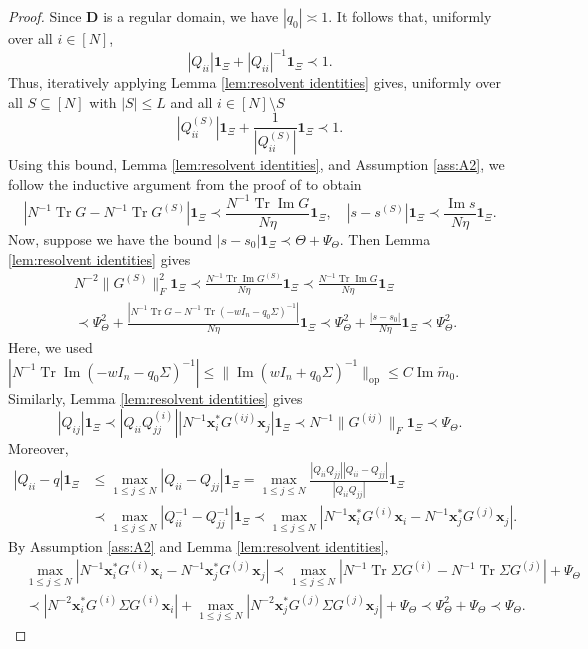 \documentclass[11pt,reqno]{amsart}
\def\x{\mathbf{x}}
\def\1{\mathbf{1}}
\def\bD{\mathbf{D}}
\def\Im{\operatorname{Im}}
\def\op{\mathrm{op}}
\def\Tr{\operatorname{Tr}}
\theoremstyle{definition}
\numberwithin{equation}{section}
\numberwithin{figure}{section}
\begin{document}
\begin{proof}
Since $\bD$ is a regular domain, we have $|q_0|\asymp 1$. It follows that, uniformly over all $i\in[N]$,
\[
    |Q_{ii}|\1_\Xi+|Q_{ii}|^{-1}\1_\Xi\prec 1.
\]
Thus, iteratively applying Lemma \ref{lem:resolvent identities} gives, uniformly over all $S\subseteq[N]$ with $|S|\leq L$ and all $i\in[N]\setminus S$
\[
    |Q_{ii}^{(S)}|\1_\Xi+\frac{1}{|Q_{ii}^{(S)}|}\1_\Xi\prec 1.
\]
Using this bound, Lemma \ref{lem:resolvent identities}, and Assumption \ref{ass:A2}, we follow the inductive argument from the proof of \cite[Lemma 4.2]{fan2026anisotropic} to obtain
\[
    |N^{-1}\Tr G-N^{-1}\Tr G^{(S)}|\1_\Xi\prec \frac{N^{-1}\Tr\Im G}{N\eta}\1_\Xi,\quad |s-s^{(S)}|\1_\Xi\prec \frac{\Im s}{N\eta}\1_\Xi.
\]
Now, suppose we have the bound $|s-s_0|\1_\Xi\prec\Theta+\Psi_\Theta$. Then Lemma \ref{lem:resolvent identities} gives
\begin{align*}
    &N^{-2}\|G^{(S)}\|_F^2\1_\Xi\prec\frac{N^{-1}\Tr\Im G^{(S)}}{N\eta}\1_\Xi\prec \frac{N^{-1}\Tr\Im G}{N\eta}\1_\Xi\\
    &\prec \Psi_\Theta^2+\frac{|N^{-1}\Tr G-N^{-1}\Tr(-wI_n-q_0\Sigma)^{-1}|}{N\eta}\1_\Xi\prec \Psi_\Theta^2+\frac{|s-s_0|}{N\eta}\1_\Xi\prec \Psi_\Theta^2.
\end{align*}
Here, we used $|N^{-1}\Tr\Im(-wI_n-q_0\Sigma)^{-1}|\leq \|\Im(wI_n+q_0\Sigma)^{-1}\|_\op\leq C\Im\widetilde m_0$. Similarly, Lemma \ref{lem:resolvent identities} gives
\[
    |Q_{ij}|\1_\Xi\prec |Q_{ii}Q_{jj}^{(i)}||N^{-1}\x_i^*G^{(ij)}\x_j|\1_\Xi\prec N^{-1}\|G^{(ij)}\|_F\1_\Xi\prec\Psi_\Theta.
\]
Moreover,
\begin{align*}
    |Q_{ii}-q|\1_\Xi&\leq \max_{1\leq j\leq N}|Q_{ii}-Q_{jj}|\1_\Xi=\max_{1\leq j\leq N}\frac{|Q_{ii}Q_{jj}||Q_{ii}-Q_{jj}|}{|Q_{ii}Q_{jj}|}\1_\Xi\\
    &\prec \max_{1\leq j\leq N}|Q_{ii}^{-1}-Q_{jj}^{-1}| \1_\Xi\prec\max_{1\leq j\leq N}|N^{-1}\x_i^*G^{(i)}\x_i-N^{-1}\x_j^*G^{(j)}\x_j|.
\end{align*}
By Assumption \ref{ass:A2} and Lemma \ref{lem:resolvent identities},
\begin{align*}
    &\max_{1\leq j\leq N}|N^{-1}\x_i^*G^{(i)}\x_i-N^{-1}\x_j^*G^{(j)}\x_j|\prec \max_{1\leq j\leq N}|N^{-1}\Tr\Sigma G^{(i)}-N^{-1}\Tr\Sigma G^{(j)}|+\Psi_\Theta\\
    &\prec |N^{-2}\x_i^*G^{(i)}\Sigma G^{(i)}\x_i|+\max_{1\leq j\leq N}|N^{-2}\x_j^*G^{(j)}\Sigma G^{(j)}\x_j|+\Psi_\Theta\prec \Psi_\Theta^2+\Psi_\Theta\prec\Psi_\Theta.
\end{align*}

\end{proof}
\end{document}
